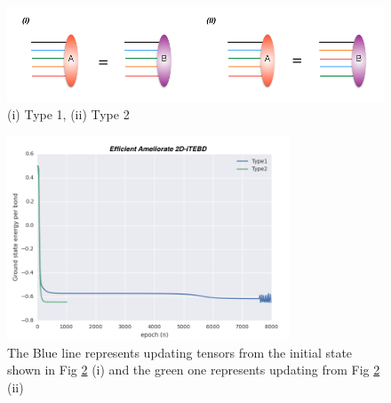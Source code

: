 \begin{figure}[ht]
	\centering
	\includegraphics[width=1.00\textwidth]{figures/fig322.png}
	\caption[Different methods to initialize the states]{(i) Type 1, (ii) Type 2}
	\label{fig322}
\end{figure}

\begin{figure}[ht]
	\centering
	\includegraphics[width=0.75\textwidth]{figures/fig323.png}
	\caption[Comparison the results of Heisenberg model on square lattice which are obtaining from different initial states.]{The Blue line represents updating tensors from the initial state shown in Fig \ref{fig322} (i) and the green one represents updating from Fig \ref{fig322} (ii)}
	\label{fig322}
\end{figure}





